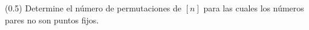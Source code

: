 (0.5) Determine el número de permutaciones de $[n]$ para las cuales los números pares no son puntos fijos.
